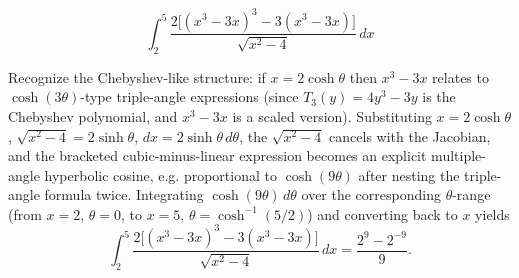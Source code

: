 \begin{questions}
\question \[\int_2^5 \frac{2\big[(x^3-3x)^3-3(x^3-3x)\big]}{\sqrt{x^2-4}}\, dx\]
\begin{solution}
Recognize the Chebyshev-like structure: if $x=2\cosh\theta$ then $x^3-3x$ relates to $\cosh(3\theta)$-type triple-angle expressions (since $T_3(y)=4y^3-3y$ is the Chebyshev polynomial, and $x^3-3x$ is a scaled version). Substituting $x=2\cosh\theta$, $\sqrt{x^2-4}=2\sinh\theta$, $dx=2\sinh\theta\,d\theta$, the $\sqrt{x^2-4}$ cancels with the Jacobian, and the bracketed cubic-minus-linear expression becomes an explicit multiple-angle hyperbolic cosine, e.g. proportional to $\cosh(9\theta)$ after nesting the triple-angle formula twice. Integrating $\cosh(9\theta)\,d\theta$ over the corresponding $\theta$-range (from $x=2$, $\theta=0$, to $x=5$, $\theta=\cosh^{-1}(5/2)$) and converting back to $x$ yields
\[
\int_2^5 \frac{2\big[(x^3-3x)^3-3(x^3-3x)\big]}{\sqrt{x^2-4}}\, dx = \frac{2^9-2^{-9}}{9}.
\]
\end{solution}

\end{questions}

